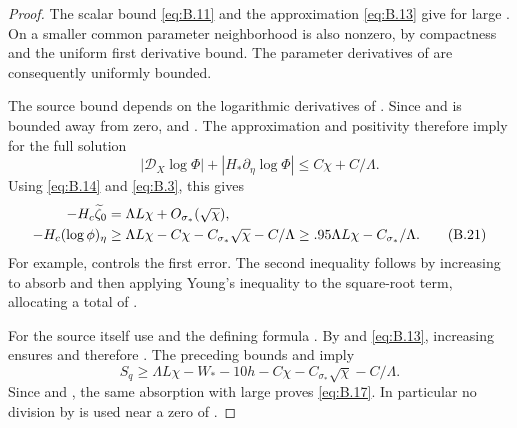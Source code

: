 \begin{proof}
The scalar bound \eqref{eq:B.11} and the approximation \eqref{eq:B.13} give
 for large . On a smaller
common parameter neighborhood  is also nonzero, by compactness and the
uniform first derivative bound. The parameter derivatives of  are
consequently uniformly bounded.

The source bound depends on the logarithmic derivatives of . Since
 and
 is bounded away from zero,
 and
. The approximation and positivity
therefore imply for the full solution
\begin{equation}
  |\mathcal D_X\log\Phi|+|H_*\partial_\eta\log\Phi|\leq C\chi+C/\Lambda.
  \tag{B.20}\label{eq:B.20}
\end{equation}
Using \eqref{eq:B.14} and \eqref{eq:B.3}, this gives
\begin{align}
  -H_c\widetilde\zeta_0&=\Lambda L\chi+O_{\sigma_*}(\sqrt\chi),\notag\\
  -H_c(\log\phi)_\eta
    &\geq\Lambda L\chi-C\chi-C_{\sigma_*}\sqrt\chi-C/\Lambda
      \geq.95\Lambda L\chi-C_{\sigma_*}/\Lambda.
  \tag{B.21}\label{eq:B.21}
\end{align}
For example,
 controls the first
error. The second inequality follows by increasing  to absorb
 and then applying Young's inequality to the square-root term, allocating
a total of .

For the source itself use  and the defining formula
. By
 and \eqref{eq:B.13}, increasing
 ensures  and therefore
. The preceding bounds and
 imply
\begin{equation*}
  S_q\geq\Lambda L\chi-W_*-10h-C\chi-C_{\sigma_*}\sqrt\chi-C/\Lambda.
\end{equation*}
Since  and , the same absorption
with  large proves \eqref{eq:B.17}. In particular no division by
 is used near a zero of .


\end{proof}
